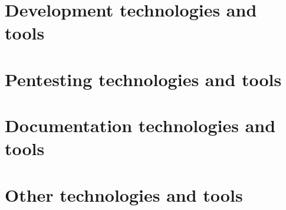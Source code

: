 \section{Development technologies and tools}
\section{Pentesting technologies and tools}
\section{Documentation technologies and tools}
\section{Other technologies and tools}
